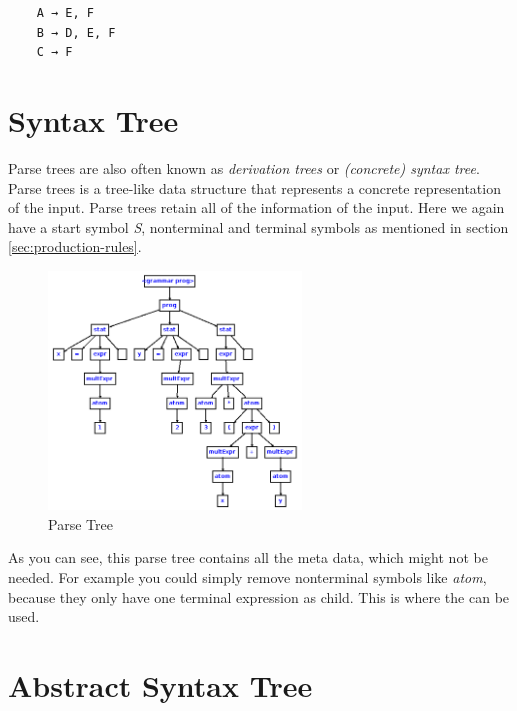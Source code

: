 \begin{verbatim}
    A → E, F
    B → D, E, F
    C → F
\end{verbatim}




\section{Syntax Tree}
\label{sec:syntax-tree}

Parse trees are also often known as \textit{derivation trees} or \textit{(concrete) syntax tree}. Parse trees is a tree-like data structure that represents a concrete representation of the input. Parse trees retain all of the information of the input. Here we again have a start symbol \textit{S}, nonterminal and terminal symbols as mentioned in section \ref{sec:production-rules}. 

\begin{figure}[H]
    \centering
        \includegraphics[width=0.6\textwidth]{figures/parse_tree.png}
        \caption{Parse Tree}
\end{figure}

As you can see, this parse tree contains all the meta data, which might not be needed. For example you could simply remove nonterminal symbols like \textit{atom}, because they only have one terminal expression as child. This is where the  can be used.





\section{Abstract Syntax Tree}
\label{sec:abstract-syntax-tree}

